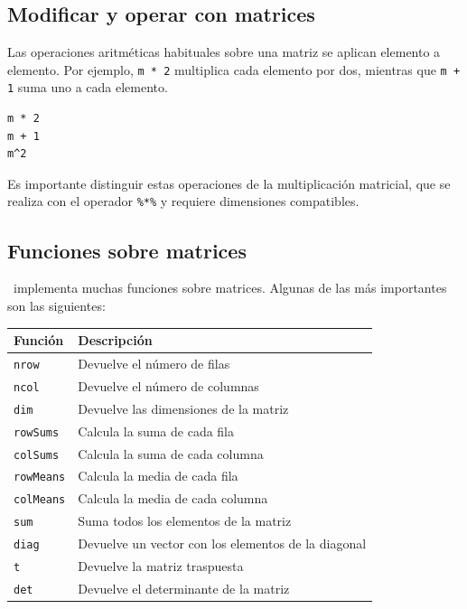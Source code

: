 \documentclass[11pt,a4paper]{article}
\newcommand{\R}{\textcolor{azuluc}{\faIcon{r-project}}}
\theoremstyle{exercise}
\begin{document}
\subsection{Modificar y operar con matrices}


Las operaciones aritméticas habituales sobre una matriz se aplican elemento a elemento. Por ejemplo, \texttt{m * 2} multiplica cada elemento por dos, mientras que \texttt{m + 1} suma uno a cada elemento.

\begin{lstlisting}[style=rstyle]
m * 2
m + 1
m^2
\end{lstlisting}

Es importante distinguir estas operaciones de la multiplicación matricial, que se realiza con el operador \texttt{\%*\%} y requiere dimensiones compatibles.

\subsection{Funciones sobre matrices}

\R\ implementa muchas funciones sobre matrices. Algunas de las más importantes son las siguientes:

\begin{center}
	\begin{tabular}{|l|l|}
		\hline
		Función & Descripción \\		
		\hline
		\verb|nrow| & Devuelve el número de filas \\
		\verb|ncol| & Devuelve el número de columnas \\
		\verb|dim| & Devuelve las dimensiones de la matriz \\
   		\verb|rowSums| & Calcula la suma de cada fila \\
		\verb|colSums| & Calcula la suma de cada columna \\
		\verb|rowMeans| & Calcula la media de cada fila \\
		\verb|colMeans| & Calcula la media de cada columna \\
		\verb|sum| & Suma todos los elementos de la matriz \\
		\verb|diag| & Devuelve un vector con los elementos de la diagonal \\
		\verb|t| & Devuelve la matriz traspuesta \\
		\verb|det| & Devuelve el determinante de la matriz \\
		\hline
	\end{tabular}
\end{center}
\end{document}
